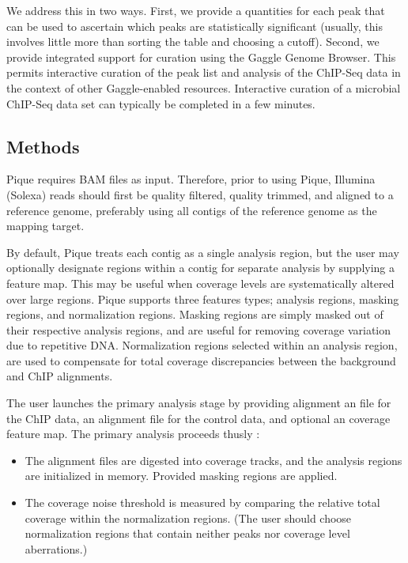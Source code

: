 \documentclass{bioinfo}
\begin{document}
We address this in two ways. First, we provide a quantities for each
peak that can be used to ascertain which peaks are statistically
significant (usually, this involves little more than sorting the table
and choosing a cutoff). Second, we provide integrated support for
curation using the Gaggle Genome Browser. This permits interactive
curation of the peak list and analysis of the ChIP-Seq data in the
context of other Gaggle-enabled resources. Interactive curation of a
microbial ChIP-Seq data set can typically be completed in a few
minutes.

\begin{methods}
\section{Methods}

\noindent Pique requires BAM files as input\cite{sam_format}.
Therefore, prior to using Pique, Illumina (Solexa) reads should first
be quality filtered, quality trimmed, and aligned to a reference
genome, preferably using all contigs of the reference genome as the
mapping target. 

By default, Pique treats each contig as a single analysis region, but
the user may optionally designate regions within a contig for separate
analysis by supplying a feature map.  This may be useful when coverage
levels are systematically altered over large regions.  Pique supports
three features types; analysis regions, masking regions, and
normalization regions. Masking regions are simply masked out of their
respective analysis regions, and are useful for removing coverage
variation due to repetitive DNA. Normalization regions selected within
an analysis region, are used to compensate for total coverage
discrepancies between the background and ChIP alignments.

The user launches the primary analysis stage by providing alignment an
file for the ChIP data, an alignment file for the control data, and
optional an coverage feature map. The primary analysis proceeds thusly
:

\begin{itemize}

\item The alignment files are digested into coverage tracks, and the
  analysis regions are initialized in memory. Provided masking regions
  are applied.

\item The coverage noise threshold is measured by comparing the
  relative total coverage within the normalization regions. (The user
  should choose normalization regions that contain neither peaks nor
  coverage level aberrations.)


\end{itemize}
\end{methods}
\end{document}
